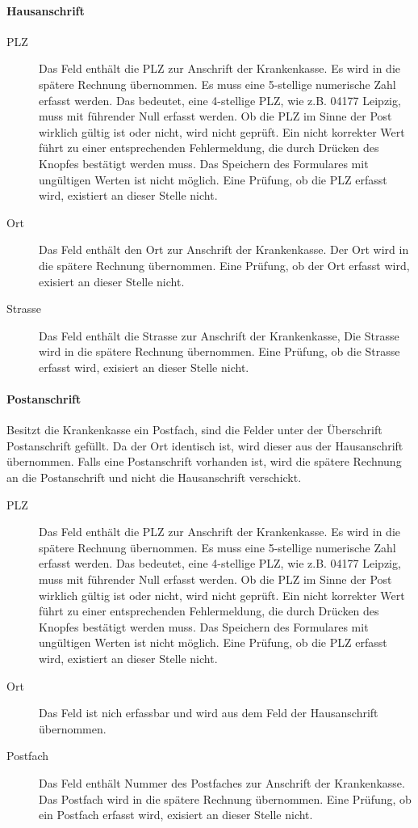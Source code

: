 \paragraph{Hausanschrift}
\begin{description}
\item[PLZ] 
Das Feld enthält die PLZ zur Anschrift der Krankenkasse. 
Es wird in die 
spätere Rechnung übernommen. Es muss eine 5-stellige numerische Zahl
 erfasst werden. Das
bedeutet, eine 4-stellige PLZ, wie z.B. 04177 Leipzig,
muss mit führender Null erfasst werden. Ob
die PLZ im Sinne der Post wirklich gültig ist oder nicht, wird nicht
geprüft. Ein nicht korrekter Wert führt zu einer entsprechenden Fehlermeldung,
die durch Drücken des Knopfes  bestätigt werden muss.
Das Speichern des Formulares mit ungültigen Werten ist nicht möglich.
Eine Prüfung, ob die PLZ erfasst wird, existiert an dieser Stelle nicht.
\item[Ort] 
Das Feld enthält den Ort zur Anschrift der Krankenkasse. Der Ort wird in die 
spätere Rechnung übernommen. Eine Prüfung, ob der Ort erfasst wird, exisiert
an dieser Stelle nicht.
\item[Strasse] 
Das Feld enthält die Strasse zur Anschrift der Krankenkasse, Die Strasse 
wird in die 
spätere Rechnung übernommen. Eine Prüfung, ob die Strasse erfasst wird, 
exisiert an dieser Stelle nicht.
\end{description}

\paragraph{Postanschrift}
Besitzt die Krankenkasse ein Postfach, sind die Felder unter der
Überschrift Postanschrift gefüllt. Da der Ort identisch ist, wird dieser aus
der Hausanschrift übernommen. Falls eine Postanschrift vorhanden ist,
wird die spätere Rechnung an die Postanschrift und nicht die Hausanschrift
verschickt.
\begin{description}
\item[PLZ] 
Das Feld enthält die PLZ zur Anschrift der Krankenkasse. 
Es wird in die 
spätere Rechnung übernommen. Es muss eine 5-stellige numerische Zahl
 erfasst werden. Das
bedeutet, eine 4-stellige PLZ, wie z.B. 04177 Leipzig,
muss mit führender Null erfasst werden. Ob
die PLZ im Sinne der Post wirklich gültig ist oder nicht, wird nicht
geprüft. Ein nicht korrekter Wert führt zu einer entsprechenden Fehlermeldung,
die durch Drücken des Knopfes  bestätigt werden muss.
Das Speichern des Formulares mit ungültigen Werten ist nicht möglich.
Eine Prüfung, ob die PLZ erfasst wird, existiert an dieser Stelle nicht.
\item[Ort] 
Das Feld ist nich erfassbar und wird aus dem Feld  der
Hausanschrift übernommen.
\item[Postfach] 
Das Feld enthält Nummer des Postfaches zur Anschrift der Krankenkasse.
Das Postfach wird in die 
spätere Rechnung übernommen. Eine Prüfung, ob ein Postfach erfasst wird, 
exisiert an dieser Stelle nicht.
\end{description}

